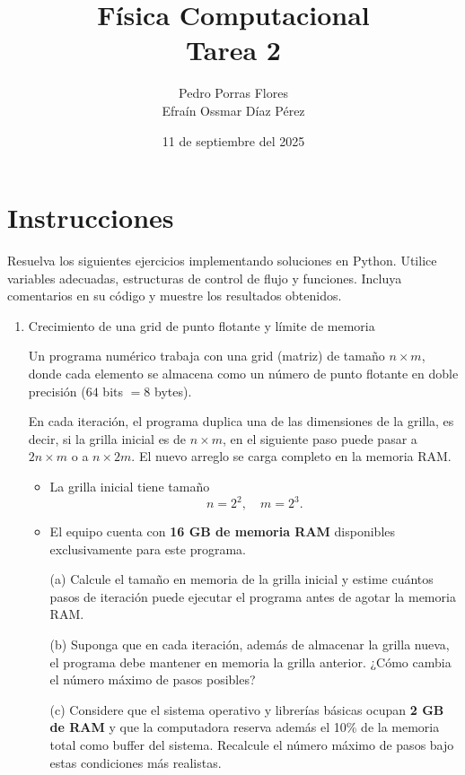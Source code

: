\documentclass[12pt]{article}
\title{Física Computacional \\ Tarea 2}
\author{Pedro Porras Flores\\ Efraín Ossmar Díaz Pérez}
\date{11 de septiembre del 2025}
\begin{document}
\maketitle

\section*{Instrucciones}
Resuelva los siguientes ejercicios implementando soluciones en Python. Utilice variables adecuadas, estructuras de control de flujo y funciones. Incluya comentarios en su código y muestre los resultados obtenidos.

\begin{enumerate}[label=\textbf{\arabic*.}]

\item Crecimiento de una grid de punto flotante y límite de memoria

Un programa numérico trabaja con una grid (matriz) de tamaño $n \times m$, donde cada elemento se almacena como un número de punto flotante en doble precisión ($64$ bits $=8$ bytes).  

En cada iteración, el programa duplica una de las dimensiones de la grilla, es decir, si la grilla inicial es de $n \times m$, en el siguiente paso puede pasar a $2n \times m$ o a $n \times 2m$. El nuevo arreglo se carga completo en la memoria RAM.  

\begin{itemize}
    \item La grilla inicial tiene tamaño
    \[
    n=2^2, \quad m=2^3.
    \]  
    \item El equipo cuenta con \textbf{16 GB de memoria RAM} disponibles exclusivamente para este programa.  
\end{itemize}

\begin{enumerate}
    \item[(a)] Calcule el tamaño en memoria de la grilla inicial y estime cuántos pasos de iteración puede ejecutar el programa antes de agotar la memoria RAM.  

    \item[(b)] Suponga que en cada iteración, además de almacenar la grilla nueva, el programa debe mantener en memoria la grilla anterior. ¿Cómo cambia el número máximo de pasos posibles?   
    
    \item[(c)] Considere que el sistema operativo y librerías básicas ocupan \textbf{2 GB de RAM} y que la computadora reserva además el 10\% de la memoria total como buffer del sistema. Recalcule el número máximo de pasos bajo estas condiciones más realistas. 


\end{enumerate}
\end{enumerate}
\end{document}
